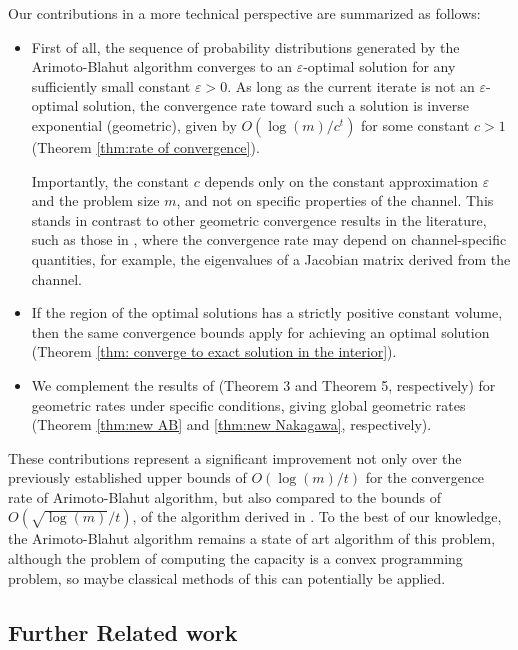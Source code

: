 \documentclass[11pt, letterpaper]{article}
\begin{document}
Our contributions in a more technical perspective are summarized as follows:
\begin{itemize}
    \item First of all, the sequence of probability distributions generated by the Arimoto-Blahut algorithm converges to an $\varepsilon$-optimal solution for any sufficiently small constant $\varepsilon > 0$. As long as the current iterate is not an $\varepsilon$-optimal solution, the convergence rate toward such a solution is inverse exponential (geometric), given by $O\left({\log(m)}/{c^t} \right)$ for some constant $c>1$ (Theorem \ref{thm:rate of convergence}). 
       
    Importantly, the constant $c$ depends only on the constant approximation $\varepsilon$ and the problem size $m$, and not on specific properties of the channel. This stands in contrast to other geometric convergence results in the literature, such as those in \cite{Arimoto1972AnAF,Nakagawa2020AnalysisOT}, where the convergence rate may depend on channel-specific quantities, for example, the eigenvalues of a Jacobian matrix derived from the channel.
    \item If the region of the optimal solutions has a strictly positive constant volume, then the same convergence bounds apply for achieving an optimal solution (Theorem \ref{thm: converge to exact solution in the interior}).
    \item We complement the results of \cite{Arimoto1972AnAF,Nakagawa2020AnalysisOT} (Theorem 3 and Theorem 5, respectively) for geometric rates under specific conditions, giving global geometric rates (Theorem \ref{thm:new AB} and \ref{thm:new Nakagawa}, respectively). 
\end{itemize}

These contributions represent a significant improvement not only over the previously established upper bounds of $O\left({\log(m)}/{t}\right)$ for the convergence rate of Arimoto-Blahut algorithm, but also compared to the bounds of $O\left({\sqrt{\log(m)}}/{t}\right)$, of the algorithm derived in \cite{SutterSEL15}. 
To the best of our knowledge, the Arimoto-Blahut algorithm remains a state of art algorithm of this problem, although the problem of computing the capacity is a convex programming problem, so maybe classical methods of this can potentially be applied. 

\subsection{Further Related work}
\end{document}

